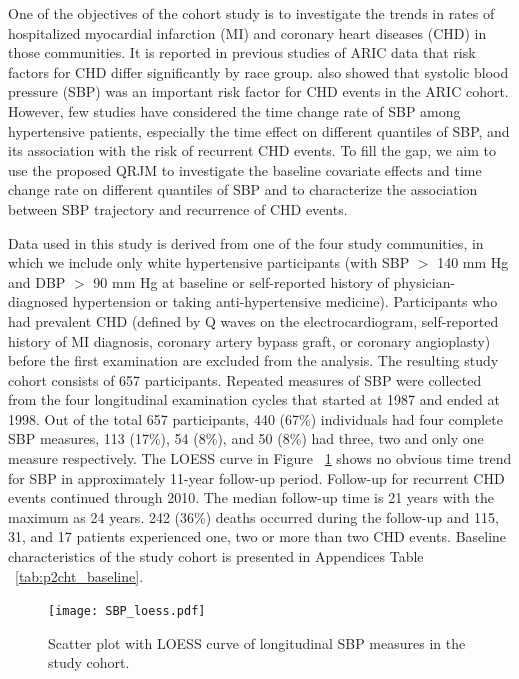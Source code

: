 One of the objectives of the cohort study is to investigate the trends in rates of hospitalized myocardial infarction (MI) and coronary heart diseases (CHD) in those communities. It is reported in previous studies of ARIC data that risk factors for CHD differ significantly by race group. \cite{wattanakit2005risk, rodriguez2014systolic} also showed that systolic blood pressure (SBP) was an important risk factor for CHD events in the ARIC cohort. However, few studies have considered the time change rate of SBP among hypertensive patients, especially the time effect on different quantiles of SBP, and its association with the risk of recurrent CHD events. To fill the gap, we aim to use the proposed QRJM to investigate the baseline covariate effects and time change rate on different quantiles of SBP and to characterize the association between SBP trajectory and recurrence of CHD events.

Data used in this study is derived from one of the four study communities, in which we include only white hypertensive participants (with SBP $>$ 140 mm Hg and DBP $>$ 90 mm Hg at baseline or self-reported history of physician-diagnosed hypertension or taking anti-hypertensive medicine). Participants who had prevalent CHD (defined by Q waves on the electrocardiogram, self-reported history of MI diagnosis, coronary artery bypass graft, or coronary angioplasty) before the first examination are excluded from the analysis. The resulting study cohort consists of 657 participants. Repeated measures of SBP were collected from the four longitudinal examination cycles that started at 1987 and ended at 1998. Out of the total 657 participants, 440 (67\%) individuals had four complete SBP measures, 113 (17\%), 54 (8\%), and 50 (8\%) had three, two and only one measure respectively. The LOESS curve in Figure ~\ref{fig:p2_sbp_loess} shows no obvious time trend for SBP in approximately 11-year follow-up period. Follow-up for recurrent CHD events continued through 2010. The median follow-up time is 21 years with the maximum as 24 years. 242 (36\%) deaths occurred during the follow-up and 115, 31, and 17 patients experienced one, two or more than two CHD events. Baseline characteristics of the study cohort is presented in Appendices Table ~\ref{tab:p2cht_baseline}.

\begin{figure}[H]
\centering
\texttt{[image: SBP\_loess.pdf]}
\caption{Scatter plot with LOESS curve of longitudinal SBP measures in the study cohort.}
\label{fig:p2_sbp_loess}
\end{figure}

